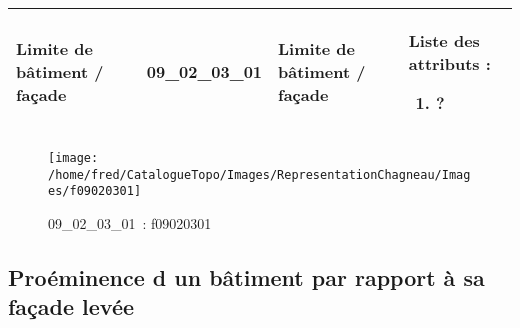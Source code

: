 \documentclass[12pt,titlepage]{book}
\begin{document}
\renewcommand{\arraystretch}{1.2}
\begin{supertabular}{|p{10cm}|c|p{13cm}|p{12cm}|}
 Limite de bâtiment / façade & 09\_02\_03\_01 & Limite de bâtiment / façade & Liste des attributs :
\begin{enumerate}
  \item ?\end{enumerate}
\\
\hline
\end{supertabular}
\begin{figure}[h!]
  \hfill         %
  \begin{minipage}[t]{3cm}
    \begin{center}
      \texttt{[image: /home/fred/CatalogueTopo/Images/RepresentationChagneau/Images/f09020301]}
      \caption[~09\_02\_03\_01]{\small{09\_02\_03\_01~:} \tiny{f09020301}}\label{f09020301}
    \end{center}
  \end{minipage}
\end{figure}


\subsection{Proéminence d un bâtiment par rapport à sa façade levée}
\noindent
\vspace{\baselineskip}
\end{document}
